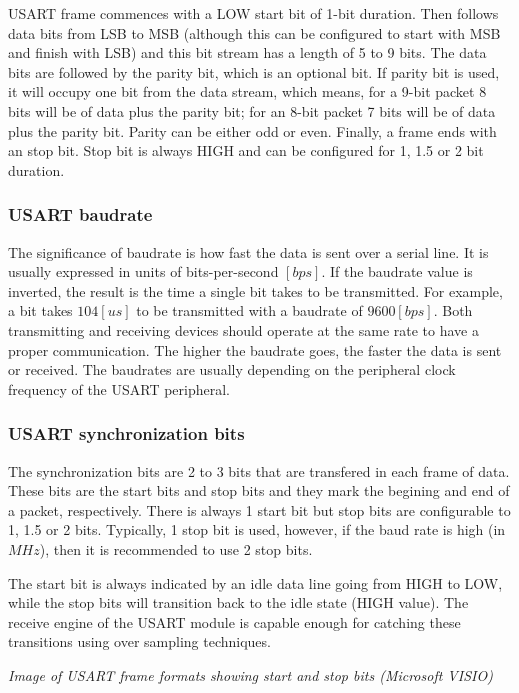 \documentclass[
a4paper, %
11pt, %
onecolumn, %
openany, %
]{memoir}
\begin{document}
USART frame commences with a LOW start bit of 1-bit duration. Then follows data bits from LSB to MSB (although this can be configured to start with MSB and finish with LSB) and this bit stream has a length of 5 to 9 bits. The data bits are followed by the parity bit, which is an optional bit. If parity bit is used, it will occupy one bit from the data stream, which means, for a 9-bit packet 8 bits will be of data plus the parity bit; for an 8-bit packet 7 bits will be of data plus the parity bit. Parity can be either odd or even. Finally, a frame ends with an stop bit. Stop bit is always HIGH and can be configured for 1, 1.5 or 2 bit duration.

\subsubsection{USART baudrate}
The significance of baudrate is how fast the data is sent over a serial line. It is usually expressed in units of bits-per-second $[bps]$. If the baudrate value is inverted, the result is the time a single bit takes to be transmitted. For example, a bit takes $104 [us]$ to be transmitted with a baudrate of $9600 [bps]$. Both transmitting and receiving devices should operate at the same rate to have a proper communication. The higher the baudrate goes, the faster the data is sent or received. The baudrates are usually depending on the peripheral clock frequency of the USART peripheral.

\subsubsection{USART synchronization bits}
The synchronization bits are 2 to 3 bits that are transfered in each frame of data. These bits are the start bits and stop bits and they mark the begining and end of a packet, respectively. There is always 1 start bit but stop bits are configurable to 1, 1.5 or 2 bits. Typically, 1 stop bit is used, however, if the baud rate is high (in $MHz$), then it is recommended to use 2 stop bits.

\noindent The start bit is always indicated by an idle data line going from HIGH to LOW, while the stop bits will transition back to the idle state (HIGH value). The receive engine of the USART module is capable enough for catching these transitions using over sampling techniques.

\begin{center}
\textit{Image of USART frame formats showing start and stop bits (Microsoft VISIO)}
\end{center}
\end{document}
